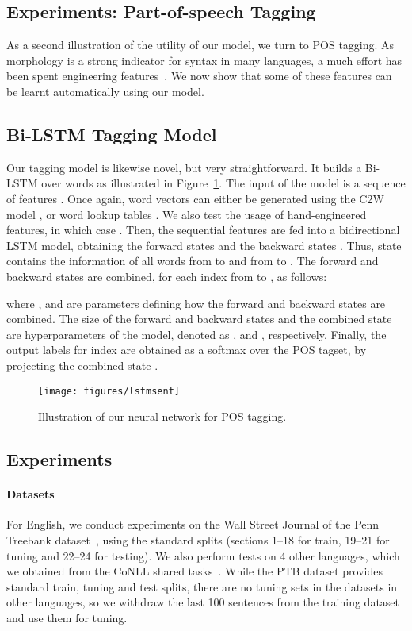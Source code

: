 \documentclass[11pt]{article}
\begin{document}
\begin{CJK*}{UTF8}{gbsn}
\section{Experiments: Part-of-speech Tagging}
\label{sec:pos}

As a second illustration of the utility of our model, we turn to POS tagging. As morphology is a strong indicator for syntax in many languages, a much effort has been spent engineering features~\cite{Nakagawa01unknownword,D13-1032}. We now show that some of these features can be learnt automatically using our model. 

\subsection{Bi-LSTM Tagging Model}

Our tagging model is likewise novel, but very straightforward. It builds a Bi-LSTM over words as illustrated in Figure~\ref{bow}. The input of the model is a sequence of features . Once again, word vectors can either be generated using the C2W model , or word lookup tables . We also test the usage of hand-engineered features, in which case  . Then, the sequential features  are fed into a bidirectional LSTM model, obtaining the forward states  and the backward states . Thus, state  contains the information of all words from  to  and  from  to . The forward and backward states are combined, for each index from  to , as follows:

where ,  and  are parameters defining how the forward and backward states are combined. The size of the forward  and backward states  and the combined state  are hyperparameters of the model, denoted as ,  and , respectively. Finally, the output labels for index  are obtained as a softmax over the POS tagset, by projecting the combined state .

\label{sec:posmodel}
\begin{figure}[ht]
\begin{center}
\centerline{\texttt{[image: figures/lstmsent]}}
\caption{Illustration of our neural network for POS tagging.}
\label{bow}
\end{center}
\end{figure} 

\subsection{Experiments}
\paragraph{Datasets}
For English, we conduct experiments on the Wall Street Journal of the Penn Treebank dataset~\cite{Marcus:1993:BLA:972470.972475}, using the standard splits (sections 1--18 for train, 19--21 for tuning and 22--24 for testing). We also perform tests on 4 other languages, which we obtained from the CoNLL shared tasks~\cite{marti2007cess,Brants02thetiger,pt,tr}. While the PTB dataset provides standard train, tuning and test splits, there are no tuning sets in the datasets in other languages, so we withdraw the last 100 sentences from the training dataset and use them for tuning. 


\end{CJK*}
\end{document}
